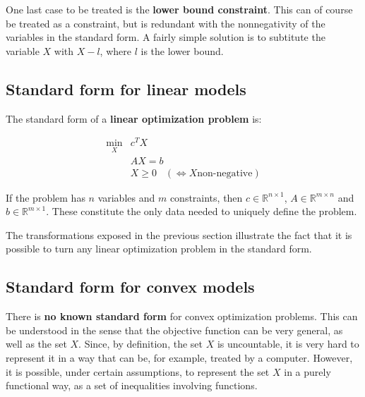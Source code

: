 One last case to be treated is the \textbf{lower bound constraint}. This can of course be treated as a constraint, but is redundant with the nonnegativity of the variables in the standard form. A fairly simple solution is to subtitute the variable $X$ with $X-l$, where $l$ is the lower bound.

\begin{center}
\end{center}


\subsection{Standard form for linear models}
The standard form of a \textbf{linear optimization problem} is:
\begin{framed}
$$\begin{array}{cl}
\min_X & c^T X \\
 & A X = b \\
 & X \geq 0 \;\;\; (\Longleftrightarrow X \text{non-negative})
\end{array}$$
\end{framed}

If the problem has $n$ variables and $m$ constraints, then $c \in \mathbb{R}^{n\times 1}$, $A \in \mathbb{R}^{m\times n}$ and $b \in \mathbb{R}^{m\times 1}$. These constitute the only data needed to uniquely define the problem. 

The transformations exposed in the previous section illustrate the fact that it is possible to turn any linear optimization problem in the standard form.

\subsection{Standard form for convex models}
There is \textbf{no known standard form} for convex optimization problems. This can be understood in the sense that the objective function can be very general, as well as the set $X$. Since, by definition, the set $X$ is uncountable, it is very hard to represent it in a way that can be, for example, treated by a computer. However, it is possible, under certain assumptions, to represent the set $X$ in a purely functional way, as a set of inequalities involving functions.

